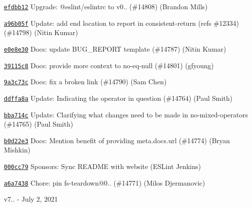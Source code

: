 \begin{DoxyItemize}
\item \href{https://github.com/eslint/eslint/commit/efdbb1227019427ec2d968a8d6e9151dd8a77c35}{\texttt{ {\ttfamily efdbb12}}} Upgrade\+: @eslint/eslintrc to v0.. (\#14808) (Brandon Mills)
\item \href{https://github.com/eslint/eslint/commit/a96b05f6c5649cfee112d605c91d95aa191e2f78}{\texttt{ {\ttfamily a96b05f}}} Update\+: add end location to report in {\ttfamily consistent-\/return} (refs \#12334) (\#14798) (Nitin Kumar)
\item \href{https://github.com/eslint/eslint/commit/e0e8e308929c9c66612505f2da89043f8592eea7}{\texttt{ {\ttfamily e0e8e30}}} Docs\+: update BUG\+\_\+\+REPORT template (\#14787) (Nitin Kumar)
\item \href{https://github.com/eslint/eslint/commit/39115c8b71d2629161359f6456f47fdbd552fddd}{\texttt{ {\ttfamily 39115c8}}} Docs\+: provide more context to no-\/eq-\/null (\#14801) (gfyoung)
\item \href{https://github.com/eslint/eslint/commit/9a3c73c130d437a65f4edba0dcb63390e68cac41}{\texttt{ {\ttfamily 9a3c73c}}} Docs\+: fix a broken link (\#14790) (Sam Chen)
\item \href{https://github.com/eslint/eslint/commit/ddffa8ad58b4b124b08061e9045fdb5370cbdbe3}{\texttt{ {\ttfamily ddffa8a}}} Update\+: Indicating the operator in question (\#14764) (Paul Smith)
\item \href{https://github.com/eslint/eslint/commit/bba714c2ed813821ed288fbc07722cdde6e534fe}{\texttt{ {\ttfamily bba714c}}} Update\+: Clarifying what changes need to be made in no-\/mixed-\/operators (\#14765) (Paul Smith)
\item \href{https://github.com/eslint/eslint/commit/b0d22e3eff18ea7f08189134c07cddceaec69a09}{\texttt{ {\ttfamily b0d22e3}}} Docs\+: Mention benefit of providing {\ttfamily meta.\+docs.\+url} (\#14774) (Bryan Mishkin)
\item \href{https://github.com/eslint/eslint/commit/000cc796fd487e7b9ba8bcc5857dd691044479cc}{\texttt{ {\ttfamily 000cc79}}} Sponsors\+: Sync README with website (ESLint Jenkins)
\item \href{https://github.com/eslint/eslint/commit/a6a7438502abc6a1e29ec35cfbe2058ffc0803b1}{\texttt{ {\ttfamily a6a7438}}} Chore\+: pin fs-\/teardown@0.. (\#14771) (Milos Djermanovic)
\end{DoxyItemize}

v7.. -\/ July 2, 2021


